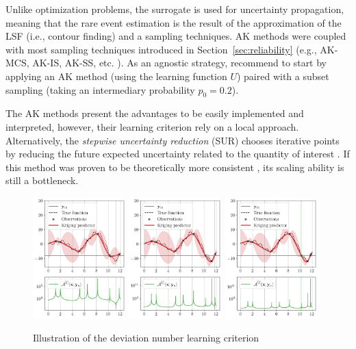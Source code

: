 Unlike optimization problems, the surrogate is used for uncertainty propagation, meaning that the rare event estimation is the result of the approximation of the LSF (i.e., contour finding) and a sampling techniques. 
AK methods were coupled with most sampling techniques introduced in Section~\ref{sec:reliability} (e.g., AK-MCS, AK-IS, AK-SS, etc. ). 
As an agnostic strategy, \citet{moustapha_ss_2022} recommend to start by applying an AK method (using the learning function $U$) paired with a subset sampling (taking an intermediary probability $p_0 =0.2$). 

The AK methods present the advantages to be easily implemented and interpreted, however, their learning criterion rely on a local approach. 
Alternatively, the \textit{stepwise uncertainty reduction} (SUR) chooses iterative points by reducing the future expected uncertainty related to the quantity of interest \citep{bect_ginsbourger_2012}. 
If this method was proven to be theoretically more consistent \citep{bect_ginsbourger_2019}, its scaling ability is still a bottleneck.  

\begin{figure}[ht]
    \centering
    \includegraphics[width=0.32\textwidth]{../numerical_experiments/chapter1/figures/contour_find_0.png}
    \includegraphics[width=0.32\textwidth]{../numerical_experiments/chapter1/figures/contour_find_1.png}
    \includegraphics[width=0.32\textwidth]{../numerical_experiments/chapter1/figures/contour_find_2.png}
    \caption{Illustration of the deviation number learning criterion}
    \label{fig:AK_1D}
\end{figure}

